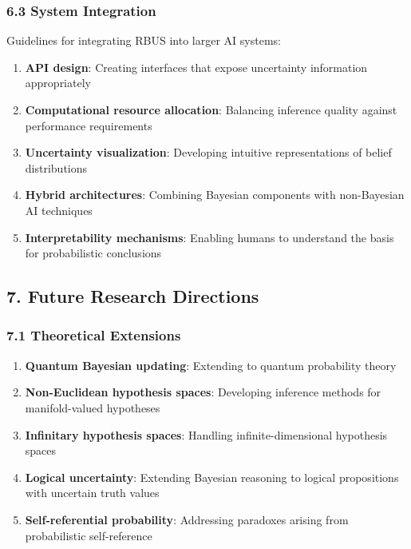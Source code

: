 \documentclass[
]{article}
\providecommand{\tightlist}{%
  \setlength{\itemsep}{0pt}\setlength{\parskip}{0pt}}
\begin{document}
\subsubsection{6.3 System Integration}\label{system-integration-1}

Guidelines for integrating RBUS into larger AI systems:

\begin{enumerate}
\def\labelenumi{\arabic{enumi}.}
\tightlist
\item
  \textbf{API design}: Creating interfaces that expose uncertainty
  information appropriately
\item
  \textbf{Computational resource allocation}: Balancing inference
  quality against performance requirements
\item
  \textbf{Uncertainty visualization}: Developing intuitive
  representations of belief distributions
\item
  \textbf{Hybrid architectures}: Combining Bayesian components with
  non-Bayesian AI techniques
\item
  \textbf{Interpretability mechanisms}: Enabling humans to understand
  the basis for probabilistic conclusions
\end{enumerate}

\subsection{7. Future Research
Directions}\label{future-research-directions-2}

\subsubsection{7.1 Theoretical
Extensions}\label{theoretical-extensions-1}

\begin{enumerate}
\def\labelenumi{\arabic{enumi}.}
\tightlist
\item
  \textbf{Quantum Bayesian updating}: Extending to quantum probability
  theory
\item
  \textbf{Non-Euclidean hypothesis spaces}: Developing inference methods
  for manifold-valued hypotheses
\item
  \textbf{Infinitary hypothesis spaces}: Handling infinite-dimensional
  hypothesis spaces
\item
  \textbf{Logical uncertainty}: Extending Bayesian reasoning to logical
  propositions with uncertain truth values
\item
  \textbf{Self-referential probability}: Addressing paradoxes arising
  from probabilistic self-reference
\end{enumerate}
\end{document}
